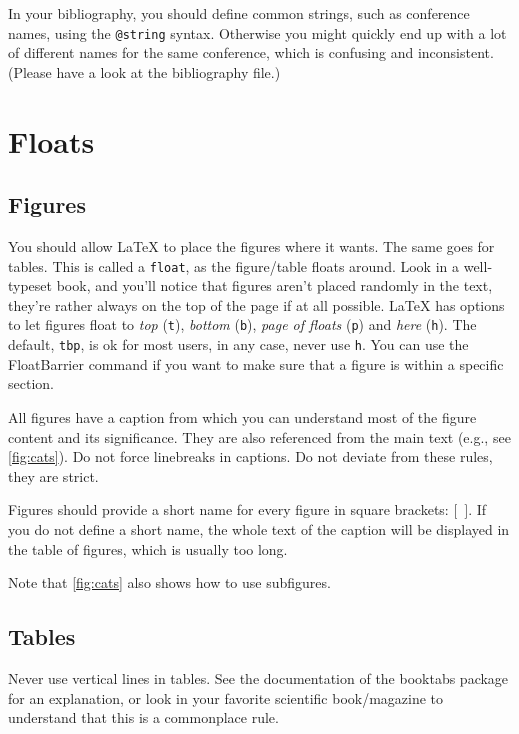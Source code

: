 \documentclass[8pt, %
a5paper, %
twoside, %
openright, %
abstract=off, %
DIV=11,      %
BCOR=8mm]{scrbook} %
\begin{document}
    In  your  bibliography, you  should  define  common strings,  such  as 
    conference  names, using  the  \verb|@string|  syntax.  Otherwise  you 
    might  quickly end  up with  a  lot of  different names  for the  same 
    conference, which is confusing and  inconsistent.  (Please have a look 
    at the bibliography file.)                                             

    \section{Floats}
    \subsection{Figures}
    You should  allow \LaTeX{} to place  the figures where it  wants.  The 
    same  goes  for  tables.   This  is  called  a  \verb+float+,  as  the 
    figure/table floats around.   Look in a well-typeset  book, and you'll 
    notice that figures aren't placed randomly in the text, they're rather 
    always  on the  top  of  the page  if  at  all possible. \LaTeX{}  has 
    options to  let figures float to  \emph{top} (\verb+t+), \emph{bottom} 
    (\verb+b+),   \emph{page  of   floats}   (\verb+p+)  and   \emph{here} 
    (\verb+h+).  The  default, \verb+tbp+, is  ok for most users,  in any 
    case, never use \verb+h+.  You can use the FloatBarrier command if you 
    want to make sure that a figure is within a specific section.          

    All figures have  a caption from which you can  understand most of the 
    figure content  and its significance.   They are also  referenced from 
    the main text (e.g., see \cref{fig:cats}).  Do not force linebreaks in 
    captions.  Do not deviate from these rules, they are strict.           

    Figures  should  provide a  short  name  for  every figure  in  square 
    brackets: $[$~$]$. If  you do not define a short  name, the whole text 
    of the caption will be displayed in the table of figures, which is 
    usually too long.
    
    Note that \cref{fig:cats} also shows how to use subfigures.



    \subsection{Tables}
    Never  use vertical  lines in  tables.  See  the documentation  of the 
    booktabs  package  for  an  explanation,  or  look  in  your  favorite 
    scientific  book/magazine to  understand  that this  is a  commonplace 
    rule.                                                                  
\end{document}
